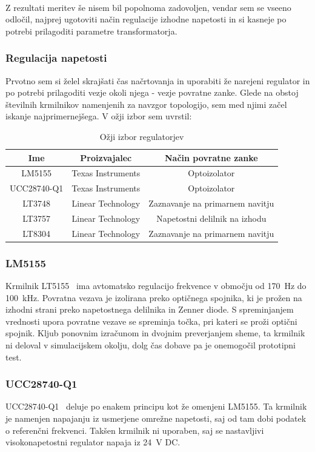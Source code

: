 \documentclass[a4paper,twoside,openright,12pt,Slovene]{book}
\begin{document}
~\\Z rezultati meritev še nisem bil popolnoma zadovoljen, vendar sem se vseeno odločil, najprej ugotoviti način regulacije izhodne napetosti in si kasneje po potrebi prilagoditi parametre transformatorja. 

	\subsubsection{Regulacija napetosti} \label{RegulacijaNapetosti}
	Prvotno sem si želel skrajšati čas načrtovanja in uporabiti že narejeni regulator in po potrebi prilagoditi vezje okoli njega - vezje povratne zanke. Glede na obstoj številnih krmilnikov namenjenih za navzgor topologijo, sem med njimi začel iskanje najprimernejšega. V ožji izbor sem uvrstil:
	
\begin{table}[h!]
\centering
\begin{tabular}{||c | c |c||}
\hline
Ime & Proizvajalec & Način povratne zanke \\[0.5ex]
\hline\hline
LM5155 & Texas Instruments & Optoizolator \\
UCC28740-Q1 & Texas Instruments & Optoizolator \\
LT3748 & Linear Technology & Zaznavanje na primarnem navitju \\
LT3757 & Linear Technology & Napetostni delilnik na izhodu \\
LT8304 & Linear Technology & Zaznavanje na primarnem navitju \\ [1ex]

\hline
\end{tabular}
\caption{Ožji izbor regulatorjev}
\end{table}

	\subsubsection{LM5155} \label{LM5155}
Krmilnik LT5155~\cite{TI:LT5155} ima avtomatsko regulacijo frekvence v območju od \SI{170}{\hertz} do \SI{100}{\kilo\hertz}. Povratna vezava je izolirana preko optičnega spojnika, ki je prožen na izhodni strani preko napetostnega delilnika in Zenner diode. S spreminjanjem vrednosti upora povratne vezave se spreminja točka, pri kateri se proži optični spojnik. Kljub ponovnim izračunom in dvojnim preverjanjem sheme, ta krmilnik ni deloval v simulacijskem okolju, dolg čas dobave pa je onemogočil prototipni test.


	\subsubsection{UCC28740-Q1} \label{UCC28740-Q1}
UCC28740-Q1~\cite{TI:UCC28740} deluje po enakem principu kot že omenjeni LM5155. Ta krmilnik je namenjen napajanju iz usmerjene omrežne napetosti, saj od tam dobi podatek o referenčni frekvenci. Takšen krmilnik ni uporaben, saj se nastavljivi visokonapetostni regulator napaja iz \SI{24}{\volt} DC.
\end{document}
